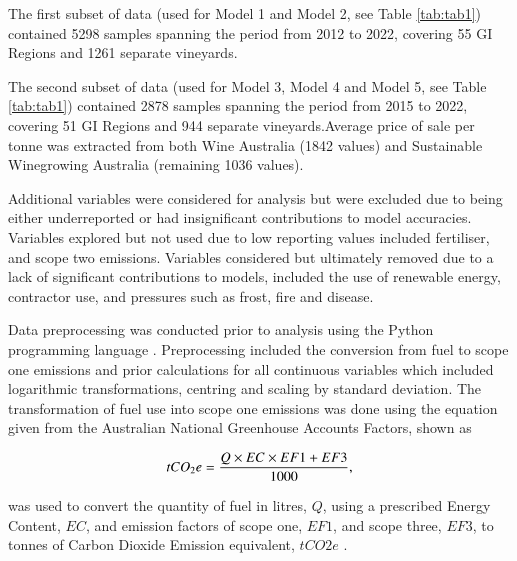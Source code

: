 \documentclass[review,12pt,authoryear]{elsarticle}
\begin{document}
\begin{linenumbers}
\par
The first subset of data (used for Model 1 and Model 2, see Table \ref{tab:tab1}) contained 5298 samples spanning the period from 2012 to 2022, covering 55 GI Regions and 1261 separate vineyards.
\par
The second subset of data (used for Model 3, Model 4 and Model 5, see Table \ref{tab:tab1}) contained 2878 samples spanning the period from 2015 to 2022, covering 51 GI Regions and 944 separate vineyards.Average price of sale per tonne was extracted from both Wine Australia (1842 values) and Sustainable Winegrowing Australia (remaining 1036 values).
\par
Additional variables were considered for analysis but were excluded due to being either underreported or had insignificant contributions to model accuracies. Variables explored but not used due to low reporting values included fertiliser, and scope two emissions. Variables considered but ultimately removed due to a lack of significant contributions to models, included the use of renewable energy, contractor use, and pressures such as frost, fire and disease.
\par
Data preprocessing was conducted prior to analysis using the Python programming language \citep{g.vanrossumPythonTutorialTechnical1995}. Preprocessing included the conversion from fuel to scope one emissions and prior calculations for all continuous variables which included logarithmic transformations, centring and scaling by standard deviation. The transformation of fuel use into scope one emissions was done using the equation given from the Australian National Greenhouse Accounts Factors, shown as
\par
\begin{equation}
\label{(1)}
    tCO_{2}e={{Q \times EC \times EF1 + EF3}\over{1000}},
\end{equation}
\par
was used to convert the quantity of fuel in litres, $Q$, using a prescribed Energy Content, $EC$, and emission factors of scope one, $EF1$, and scope three, $EF3$, to tonnes of Carbon Dioxide Emission equivalent, $tCO2e$ \citep{departmentofclimatechangeenergytheenvironmentandwaterAustralianNationalGreenhouse2022}.
\par


\end{linenumbers}
\end{document}
